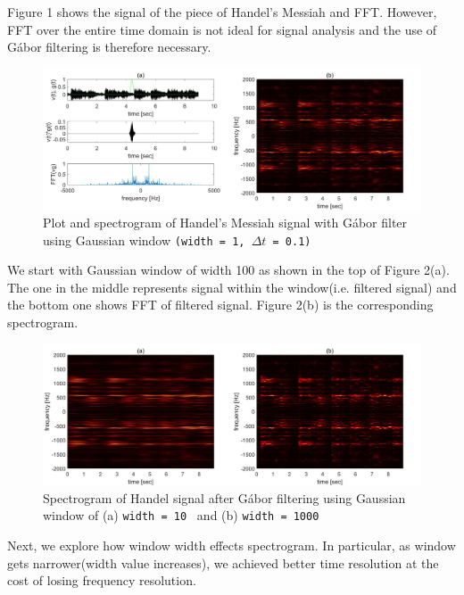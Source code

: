 \documentclass[10pt,a4paper]{article}
\numberwithin{equation}{subsection}
\begin{document}
Figure 1 shows the signal of the piece of Handel's Messiah and FFT. However, FFT over the entire time domain is not ideal for signal analysis and the use of G\'abor filtering is therefore necessary.

\begin{figure}[H]
\begin{center}
\includegraphics[scale=0.22]{f2.jpg}
\caption{Plot and spectrogram of Handel's Messiah signal with G\'abor filter using Gaussian window \texttt{(width = 1, $\Delta t$ = 0.1)}}
\end{center}
\end{figure}

We start with Gaussian window of width 100 as shown in the top of Figure 2(a). The one in the middle represents signal within the window(i.e. filtered signal) and the bottom one shows FFT of filtered signal. Figure 2(b) is the corresponding spectrogram.

\begin{figure}[H]
\begin{center}
\includegraphics[scale=0.22]{f3.jpg}
\caption{Spectrogram of Handel signal after G\'abor filtering using Gaussian window of (a) \texttt{width = 10 } and (b) \texttt{width = 1000}}
\end{center}
\end{figure}

Next, we explore how window width effects spectrogram. In particular, as window gets narrower(width value increases), we achieved better time resolution at the cost of losing frequency resolution.
\end{document}
